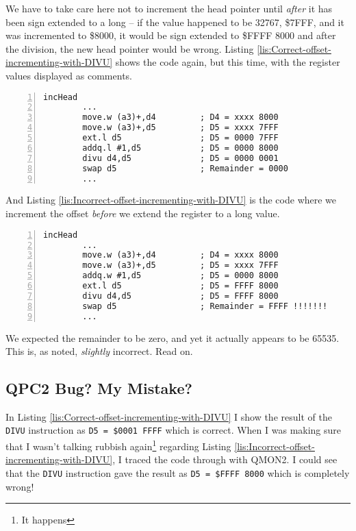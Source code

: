 We have to take care here not to increment the head pointer until
\emph{after} it has been sign extended to a long -- if the value
happened to be 32767, \$7FFF, and it was incremented to \$8000, it
would be sign extended to \$FFFF 8000 and after the division, the
new head pointer would be wrong. Listing \ref{lis:Correct-offset-incrementing-with-DIVU}
shows the code again, but this time, with the register values displayed
as comments.

\begin{lstlisting}[caption={Correct offset incrementing with DIVU},label={lis:Correct-offset-incrementing-with-DIVU},numbers=left,showstringspaces=false,tabsize=4]
incHead
        ...
        move.w (a3)+,d4         ; D4 = xxxx 8000
        move.w (a3)+,d5         ; D5 = xxxx 7FFF
        ext.l d5                ; D5 = 0000 7FFF
        addq.l #1,d5            ; D5 = 0000 8000
        divu d4,d5              ; D5 = 0000 0001
        swap d5                 ; Remainder = 0000
        ...

\end{lstlisting}

And Listing \ref{lis:Incorrect-offset-incrementing-with-DIVU} is
the code where we increment the offset \emph{before} we extend the
register to a long value.

\begin{lstlisting}[caption={Incorrect offset incrementing with DIVU},label={lis:Incorrect-offset-incrementing-with-DIVU},numbers=left,showstringspaces=false,tabsize=4]
incHead
        ...
        move.w (a3)+,d4         ; D4 = xxxx 8000
        move.w (a3)+,d5         ; D5 = xxxx 7FFF
        addq.w #1,d5            ; D5 = 0000 8000
        ext.l d5                ; D5 = FFFF 8000
        divu d4,d5              ; D5 = FFFF 8000
        swap d5                 ; Remainder = FFFF !!!!!!!
        ...

\end{lstlisting}

We expected the remainder to be zero, and yet it actually appears
to be 65535. This is, as noted, \emph{slightly} incorrect. Read on.

\subsection{QPC2 Bug? My Mistake?}

In Listing \ref{lis:Correct-offset-incrementing-with-DIVU} I show
the result of the \texttt{DIVU} instruction as \texttt{D5 = \$0001
FFFF} which is correct. When I was making sure that I wasn't talking
rubbish again\footnote{It happens} regarding Listing \ref{lis:Incorrect-offset-incrementing-with-DIVU},
I traced the code through with QMON2. I could see that the \texttt{DIVU}
instruction gave the result as \texttt{D5 = \$FFFF 8000} which is
completely wrong!

